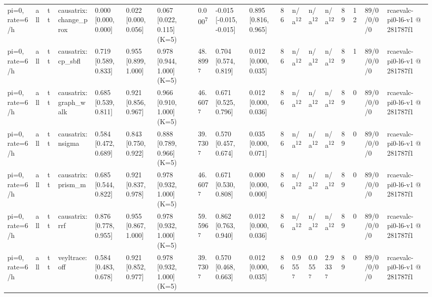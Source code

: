 \begin{table}[t]
\begin{tabular}{llllllllllllllllll}
pi=0, rate=6/h & all & tt & causatrix:change\_prox & 0.000 [0.000, 0.000] & 0.022 [0.000, 0.056] & 0.067 [0.022, 0.115] (K=5) & 0.000\textsuperscript{7} & -0.015 [-0.015, -0.015] & 0.895 [0.816, 0.965] & 86 & n/a\textsuperscript{12} & n/a\textsuperscript{12} & n/a\textsuperscript{12} & 89 & 12 & 89/0/0/0/0 & rcaevalc-pi0-l6-v1 @ 281787f1 \\
pi=0, rate=6/h & all & tt & causatrix:cp\_sbfl & 0.719 [0.589, 0.833] & 0.955 [0.899, 1.000] & 0.978 [0.944, 1.000] (K=5) & 48.899\textsuperscript{7} & 0.704 [0.574, 0.819] & 0.012 [0.000, 0.035] & 86 & n/a\textsuperscript{12} & n/a\textsuperscript{12} & n/a\textsuperscript{12} & 89 & 1 & 89/0/0/0/0 & rcaevalc-pi0-l6-v1 @ 281787f1 \\
pi=0, rate=6/h & all & tt & causatrix:graph\_walk & 0.685 [0.539, 0.811] & 0.921 [0.856, 0.967] & 0.966 [0.910, 1.000] (K=5) & 46.607\textsuperscript{7} & 0.671 [0.525, 0.796] & 0.012 [0.000, 0.036] & 86 & n/a\textsuperscript{12} & n/a\textsuperscript{12} & n/a\textsuperscript{12} & 89 & 0 & 89/0/0/0/0 & rcaevalc-pi0-l6-v1 @ 281787f1 \\
pi=0, rate=6/h & all & tt & causatrix:nsigma & 0.584 [0.472, 0.689] & 0.843 [0.750, 0.922] & 0.888 [0.789, 0.966] (K=5) & 39.730\textsuperscript{7} & 0.570 [0.457, 0.674] & 0.035 [0.000, 0.071] & 86 & n/a\textsuperscript{12} & n/a\textsuperscript{12} & n/a\textsuperscript{12} & 89 & 0 & 89/0/0/0/0 & rcaevalc-pi0-l6-v1 @ 281787f1 \\
pi=0, rate=6/h & all & tt & causatrix:prism\_m & 0.685 [0.544, 0.822] & 0.921 [0.837, 0.978] & 0.978 [0.932, 1.000] (K=5) & 46.607\textsuperscript{7} & 0.671 [0.530, 0.808] & 0.000 [0.000, 0.000] & 86 & n/a\textsuperscript{12} & n/a\textsuperscript{12} & n/a\textsuperscript{12} & 89 & 0 & 89/0/0/0/0 & rcaevalc-pi0-l6-v1 @ 281787f1 \\
pi=0, rate=6/h & all & tt & causatrix:rrf & 0.876 [0.778, 0.955] & 0.955 [0.867, 1.000] & 0.978 [0.932, 1.000] (K=5) & 59.596\textsuperscript{7} & 0.862 [0.763, 0.940] & 0.012 [0.000, 0.036] & 86 & n/a\textsuperscript{12} & n/a\textsuperscript{12} & n/a\textsuperscript{12} & 89 & 0 & 89/0/0/0/0 & rcaevalc-pi0-l6-v1 @ 281787f1 \\
pi=0, rate=6/h & all & tt & veyltrace:off & 0.584 [0.483, 0.678] & 0.921 [0.852, 0.977] & 0.978 [0.932, 1.000] (K=5) & 39.730\textsuperscript{7} & 0.570 [0.468, 0.663] & 0.012 [0.000, 0.035] & 86 & 0.955\textsuperscript{7} & 0.055\textsuperscript{7} & 2.933\textsuperscript{7} & 89 & 0 & 89/0/0/0/0 & rcaevalc-pi0-l6-v1 @ 281787f1 \\

\end{tabular}
\end{table}
